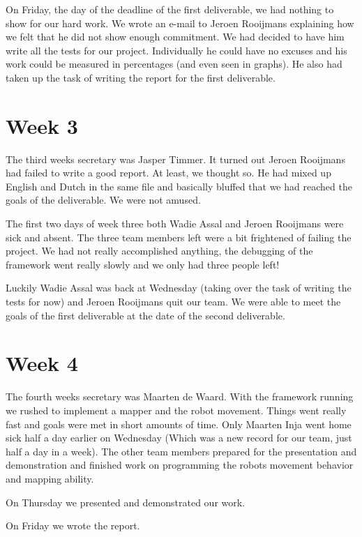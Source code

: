 \documentclass[a4paper,10pt]{article}
\begin{document}
On Friday, the day of the deadline of the first deliverable, we had nothing to show for our hard work. We wrote
an e-mail to Jeroen Rooijmans explaining how we felt that he did not show enough commitment. We had decided to 
have him write all the tests for our project. Individually he could have no excuses and his work could be measured
in percentages (and even seen in graphs). He also had taken up the task of writing the report for the first deliverable. 

\section{Week 3}
The third weeks secretary was Jasper Timmer. 
It turned out Jeroen Rooijmans had failed to write a good report. At least, we thought so. He had mixed up English 
and Dutch in the same file and basically bluffed that we had reached the goals of the deliverable. We were not amused. 

The first two days of week three both Wadie Assal and Jeroen Rooijmans were sick and absent. The three team members left
were a bit frightened of failing the project. We had not really accomplished anything, the debugging of the framework
went really slowly and we only had three people left! 

Luckily Wadie Assal was back at Wednesday (taking over the task of writing the tests for now) and Jeroen Rooijmans quit our team. 
We were able to meet the goals of the first deliverable at the date of 
the second deliverable. 

\section{Week 4}
The fourth weeks secretary was Maarten de Waard. With the framework running we rushed to implement a mapper and 
the robot movement. Things went really fast and goals were met in short amounts of time. Only Maarten Inja 
went home sick half a day earlier on Wednesday (Which was a new record for our team, just half a day in a week).
The other team members prepared for the presentation and demonstration and finished work on programming the robots
movement behavior and mapping ability.

On Thursday we presented and demonstrated our work. 

On Friday we wrote the report. 
\end{document}

